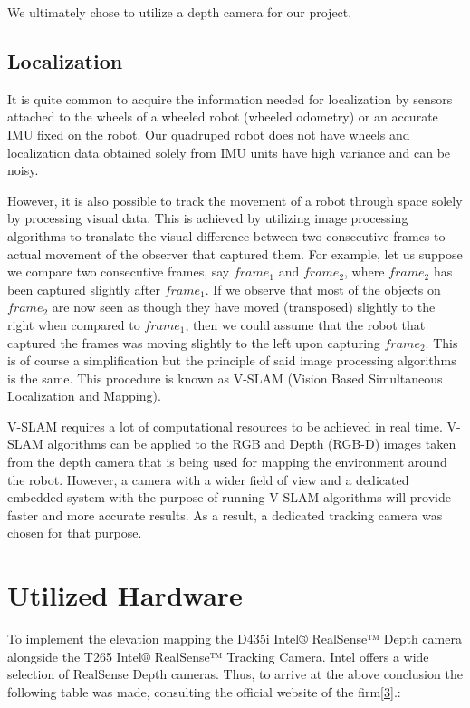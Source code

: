 \documentclass{article}
\begin{document}
We ultimately chose to utilize a depth camera for our project. 

\subsection{Localization}

It is quite common to acquire the information needed for localization by sensors attached to the wheels of a wheeled robot (wheeled odometry) or an accurate IMU fixed on the robot. Our quadruped robot does not have wheels and localization data obtained solely from IMU units have high variance and can be noisy. 

However, it is also possible to track the movement of a robot through space solely by processing visual data. This is achieved by utilizing image processing algorithms to translate the visual difference between two consecutive frames to actual movement of the observer that captured them. For example, let us suppose we compare two consecutive frames, say $frame_1$ and $frame_2$, where $frame_2$ has been captured slightly after $frame_1$. If we observe that most of the objects on $frame_2$ are now seen as though they have moved (transposed) slightly to the right when compared to $frame_1$, then we could assume that the robot that captured the frames was moving slightly to the left upon capturing $frame_2$. This is of course a simplification but the principle of said image processing algorithms is the same. This procedure is known as V-SLAM (Vision Based Simultaneous Localization and Mapping). 

V-SLAM requires a lot of computational resources to be achieved in real time. V-SLAM algorithms can be applied to the RGB and Depth (RGB-D) images taken from the depth camera that is being used for mapping the environment around the robot. However, a camera with a wider field of view and a dedicated embedded system with the purpose of running V-SLAM algorithms will provide faster and more accurate results. As a result, a dedicated tracking camera was chosen for that purpose.

\section{Utilized Hardware}

To implement the elevation mapping the D435i Intel® RealSense™  Depth camera alongside the T265 Intel® RealSense™  Tracking Camera. Intel offers a wide selection of RealSense Depth cameras. Thus, to arrive at the above conclusion the following table was made, consulting the official website of the firm\href{https://www.intelrealsense.com/#Products}{[3]}.:
\end{document}
